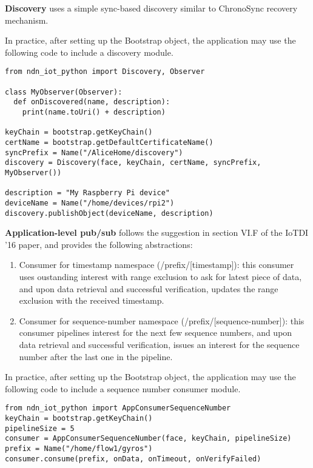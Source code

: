 \textbf{Discovery} uses a simple sync-based discovery similar to ChronoSync recovery mechanism.

In practice, after setting up the Bootstrap object, the application may use the following code to include a discovery module.
\begin{verbatim}
from ndn_iot_python import Discovery, Observer

class MyObserver(Observer):
  def onDiscovered(name, description):
    print(name.toUri() + description)

keyChain = bootstrap.getKeyChain()
certName = bootstrap.getDefaultCertificateName()
syncPrefix = Name("/AliceHome/discovery")
discovery = Discovery(face, keyChain, certName, syncPrefix, MyObserver())

description = "My Raspberry Pi device"
deviceName = Name("/home/devices/rpi2")
discovery.publishObject(deviceName, description)
\end{verbatim}

\textbf{Application-level pub/sub} follows the suggestion in section VI.F of the IoTDI '16 paper, and provides the following abstractions:
\begin{enumerate}
\item Consumer for timestamp namespace (/prefix/[timestamp]): this consumer uses oustanding interest with range exclusion to ask for latest piece of data, and upon data retrieval and successful verification, updates the range exclusion with the received timestamp.
\item Consumer for sequence-number namespace (/prefix/[sequence-number]): this consumer pipelines interest for the next few sequence numbers, and upon data retrieval and successful verification, issues an interest for the sequence number after the last one in the pipeline.
\end{enumerate}

In practice, after setting up the Bootstrap object, the application may use the following code to include a sequence number consumer module.

\begin{verbatim}
from ndn_iot_python import AppConsumerSequenceNumber
keyChain = bootstrap.getKeyChain()
pipelineSize = 5
consumer = AppConsumerSequenceNumber(face, keyChain, pipelineSize)
prefix = Name("/home/flow1/gyros")
consumer.consume(prefix, onData, onTimeout, onVerifyFailed)
\end{verbatim}

